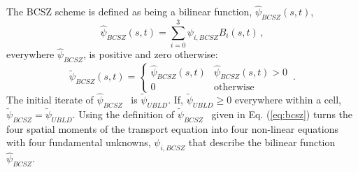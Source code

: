 \documentclass{mc2015}
\newcommand{\benum}{\begin{equation}} 			%
\newcommand{\eenum}{\end{equation}}
\newcommand{\eqt}[1]{Eq. (\ref{#1})}  %
\newcommand{\B}[1]{\ensuremath{{B_{#1} }}}
\newcommand{\BCSZ}{\ensuremath{\widetilde{\psi}_{BCSZ}}}
\newcommand{\BCSZH}{\ensuremath{\widehat{\psi}_{BCSZ}}}
\newcommand{\pec}{\, ,}
\newcommand{\pep}{\, .}
\begin{document}
The BCSZ scheme is defined as being a bilinear function, $\BCSZH(s,t)$, 
\benum
\BCSZH(s,t) = \sum_{i=0}^3{\psi_{i,BCSZ} \B{i}(s,t)} \pec
\eenum
everywhere \BCSZH, is positive and zero otherwise:
\benum
\BCSZ(s,t) = \left \{ \begin{array}{ll}
\BCSZH(s,t) & \BCSZH(s,t) > 0 \\
0	& \text{otherwise}
\end{array}
\right. \pep
\label{eq:bcsz}
\eenum
The initial iterate of \BCSZH~ is $\widetilde{\psi}_{UBLD}$.  If, $\widetilde{\psi}_{UBLD} \geq 0 $ everywhere within a cell, $\BCSZ = \widetilde{\psi}_{UBLD}$.
Using the definition of \BCSZ~ given in \eqt{eq:bcsz} turns the four spatial moments of the transport equation into four non-linear equations with four fundamental unknowns, $\psi_{i,BCSZ}$ that describe the bilinear function \BCSZH.
\end{document}
